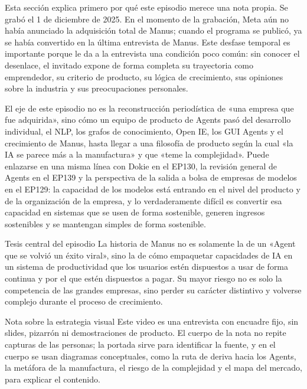 \documentclass[a4paper]{article}
\begin{document}
Esta sección explica primero por qué este episodio merece una nota propia. Se grabó el 1 de diciembre de 2025. En el momento de la grabación, Meta aún no había anunciado la adquisición total de Manus; cuando el programa se publicó, ya se había convertido en la última entrevista de Manus. Este desfase temporal es importante porque le da a la entrevista una condición poco común: sin conocer el desenlace, el invitado expone de forma completa su trayectoria como emprendedor, su criterio de producto, su lógica de crecimiento, sus opiniones sobre la industria y sus preocupaciones personales.

El eje de este episodio no es la reconstrucción periodística de «una empresa que fue adquirida», sino cómo un equipo de producto de Agents pasó del desarrollo individual, el NLP, los grafos de conocimiento, Open IE, los GUI Agents y el crecimiento de Manus, hasta llegar a una filosofía de producto según la cual «la IA se parece más a la manufactura» y que «teme la complejidad». Puede enlazarse en una misma línea con Dokie en el EP130, la revisión general de Agents en el EP139 y la perspectiva de la salida a bolsa de empresas de modelos en el EP129: la capacidad de los modelos está entrando en el nivel del producto y de la organización de la empresa, y lo verdaderamente difícil es convertir esa capacidad en sistemas que se usen de forma sostenible, generen ingresos sostenibles y se mantengan simples de forma sostenible.

\begin{importantbox}{Tesis central del episodio}
La historia de Manus no es solamente la de un «Agent que se volvió un éxito viral», sino la de cómo empaquetar capacidades de IA en un sistema de productividad que los usuarios estén dispuestos a usar de forma continua y por el que estén dispuestos a pagar. Su mayor riesgo no es solo la competencia de las grandes empresas, sino perder su carácter distintivo y volverse complejo durante el proceso de crecimiento.
\end{importantbox}

\begin{knowledgebox}{Nota sobre la estrategia visual}
Este video es una entrevista con encuadre fijo, sin slides, pizarrón ni demostraciones de producto. El cuerpo de la nota no repite capturas de las personas; la portada sirve para identificar la fuente, y en el cuerpo se usan diagramas conceptuales, como la ruta de deriva hacia los Agents, la metáfora de la manufactura, el riesgo de la complejidad y el mapa del mercado, para explicar el contenido.
\end{knowledgebox}
\end{document}
